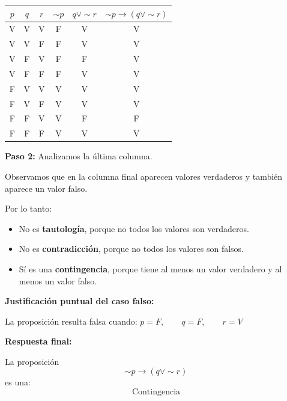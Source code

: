 \documentclass[12pt]{article}
\begin{document}
\begin{enumerate}[label=\alph*)]
		\vspace{0.3cm}
		
		\begin{center}
			\begin{tabular}{|c |c| c| c| c| c|}
				\toprule
				\(p\) & \(q\) & \(r\) & \(\sim p\) & \(q \lor \sim r\) & \(\sim p \to (q \lor \sim r)\) \\
				\midrule
				V & V & V & F & V & V \\
				V & V & F & F & V & V \\
				V & F & V & F & F & V \\
				V & F & F & F & V & V \\
				F & V & V & V & V & V \\
				F & V & F & V & V & V \\
				F & F & V & V & F & F \\
				F & F & F & V & V & V \\
				\bottomrule
			\end{tabular}
		\end{center}
		
		\vspace{0.2cm}
		
		\textbf{Paso 2:} Analizamos la última columna.
		
		Observamos que en la columna final aparecen valores verdaderos y también aparece un valor falso.
		
		Por lo tanto:
		
		\begin{itemize}
			\item No es \textbf{tautología}, porque no todos los valores son verdaderos.
			\item No es \textbf{contradicción}, porque no todos los valores son falsos.
			\item Sí es una \textbf{contingencia}, porque tiene al menos un valor verdadero y al menos un valor falso.
		\end{itemize}
		
		\textbf{Justificación puntual del caso falso:}
		
		La proposición resulta falsa cuando:
	$
		p=F,\qquad q=F,\qquad r=V
	$
		
	
		
		\textbf{Respuesta final:}
		
		La proposición
		\[
		\sim p \to (q \lor \sim r)
		\]
		es una:
		\[
		\boxed{\text{Contingencia}}
		\]
		
	\end{enumerate}
	
\end{document}
